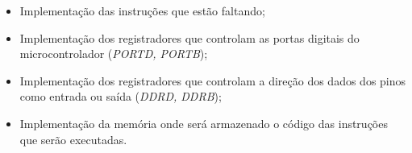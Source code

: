 \documentclass[12pt]{article}
\begin{document}
\begin{itemize}
\item Implementação das instruções que estão faltando;
\item Implementação dos registradores que controlam as portas digitais do microcontrolador (\textit{PORTD, PORTB});
\item Implementação dos registradores que controlam a direção dos dados dos pinos como entrada ou saída (\textit{DDRD, DDRB});
\item Implementação da memória onde será armazenado o código das instruções que serão executadas.
\end{itemize}



\end{document}
